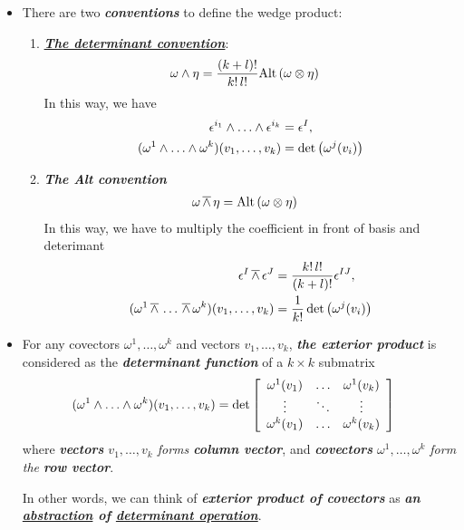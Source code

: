 \documentclass[11pt]{article}
\begin{document}
\begin{itemize}
\item \begin{remark} There are two \emph{\textbf{conventions}} to define the wedge product:
\begin{enumerate}
\item \underline{\emph{\textbf{The determinant convention}}}: 
\begin{align*}
\omega \wedge \eta &= \frac{(k+l)!}{k! \,l!}\text{Alt}\left(\omega \otimes \eta \right)
\end{align*} In this way, we have
\begin{align*}
\epsilon^{i_1} \wedge \ldots \wedge \epsilon^{i_k} &= \epsilon^{I},\\
(\omega^1 \wedge \ldots \wedge \omega^k)(v_1,\ldots,v_k) &= \det\left(\omega^{j}(v_i)\right)
\end{align*}
\item \emph{\textbf{The Alt convention}}
\begin{align*}
\omega\, \overline{\wedge} \,\eta &= \text{Alt}\left(\omega \otimes \eta \right)
\end{align*} In this way, we have to multiply the coefficient in front of basis and deterimant
\begin{align*}
\epsilon^{I}\, \overline{\wedge} \,\epsilon^{J} &= \frac{k! \,l!}{(k+l)!}\epsilon^{IJ}, \\
(\omega^1 \, \overline{\wedge} \, \ldots \, \overline{\wedge} \, \omega^k)(v_1,\ldots,v_k) &= \frac{1}{k!} \det\left(\omega^{j}(v_i)\right)
\end{align*}
\end{enumerate}
\end{remark}

\item \begin{remark}
 For any covectors $\omega^1,\ldots, \omega^k$ and vectors $v_1,\ldots,v_k$, \emph{\textbf{the exterior product}} is considered as the \emph{\textbf{determinant function}} of a $k \times k$ submatrix 
\begin{align*}
(\omega^1 \wedge \ldots \wedge \omega^k)(v_1,\ldots,v_k) &= \det\left[ \begin{array}{ccc}
\omega^{1}(v_1) & \ldots & \omega^{1}(v_k)\\
\vdots & \ddots & \vdots\\
\omega^{k}(v_1) & \ldots & \omega^{k}(v_k)
\end{array}\right] 
\end{align*} where \emph{\textbf{vectors} $v_1,\ldots,v_k$ forms \textbf{column vector}}, and \emph{\textbf{covectors} $\omega^1,\ldots, \omega^k$ form the \textbf{row vector}}. 

In other words, we can think of \emph{\textbf{exterior product of covectors}} as \emph{\textbf{an \underline{abstraction} of \underline{determinant operation}}}.
\end{remark}
\end{itemize}
\end{document}
